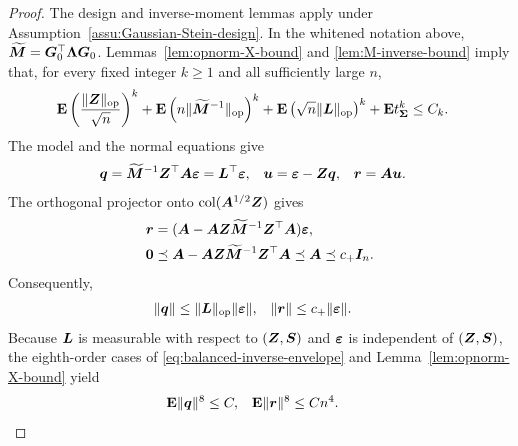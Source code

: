 \documentclass{article}
\theoremstyle{plain} %
\theoremstyle{definition} %
\theoremstyle{definition} %
\begin{document}
\begin{proof}
The design and inverse-moment lemmas apply under
Assumption~\ref{assu:Gaussian-Stein-design}.  In the whitened notation above,
$\widetilde{\boldsymbol{M}}=\boldsymbol{G}_0^\top\boldsymbol{\Lambda}\boldsymbol{G}_0$.
Lemmas~\ref{lem:opnorm-X-bound} and \ref{lem:M-inverse-bound} imply that,
for every fixed integer $k\geq1$ and all sufficiently large $n$,
\begin{align}
    {\mathbf{E}}\left(\frac{\lVert\boldsymbol{Z}\rVert_{\rm op}}{\sqrt n}\right)^k
    +{\mathbf{E}}\left(n\lVert\widetilde{\boldsymbol{M}}^{-1}\rVert_{\rm op}\right)^k
    +{\mathbf{E}}\left(\sqrt n\lVert\boldsymbol{L}\rVert_{\rm op}\right)^k
    +{\mathbf{E}} t_{\boldsymbol{\Sigma}}^k
    &\leq C_k.
    \label{eq:balanced-inverse-envelope}
\end{align}
The model and the normal equations give
\begin{align}
    \boldsymbol{q}&=\widetilde{\boldsymbol{M}}^{-1}\boldsymbol{Z}^\top\boldsymbol{A}{\boldsymbol{\varepsilon} }
        =\boldsymbol{L}^\top{\boldsymbol{\varepsilon} },
    & \boldsymbol{u}&={\boldsymbol{\varepsilon} }-\boldsymbol{Z}\boldsymbol{q},
    & \boldsymbol{r}&=\boldsymbol{A}\boldsymbol{u}.
    \label{eq:balanced-qur}
\end{align}
The orthogonal projector onto $\operatorname{col}(\boldsymbol{A}^{1/2}\boldsymbol{Z})$ gives
\begin{align}
    \boldsymbol{r}&=(\boldsymbol{A}-\boldsymbol{A}\boldsymbol{Z}\widetilde{\boldsymbol{M}}^{-1}\boldsymbol{Z}^\top\boldsymbol{A}){\boldsymbol{\varepsilon} },
    \notag\\
    \mathbf{0}&\preceq\boldsymbol{A}-\boldsymbol{A}\boldsymbol{Z}\widetilde{\boldsymbol{M}}^{-1}\boldsymbol{Z}^\top\boldsymbol{A}
       \preceq\boldsymbol{A}\preceq c_+\boldsymbol{I}_n.
    \label{eq:balanced-residual-contraction}
\end{align}
Consequently,
\begin{align*}
    \lVert\boldsymbol{q}\rVert&\leq\lVert\boldsymbol{L}\rVert_{\rm op}\lVert{\boldsymbol{\varepsilon} }\rVert,
    & \lVert\boldsymbol{r}\rVert&\leq c_+\lVert{\boldsymbol{\varepsilon} }\rVert.
\end{align*}
Because $\boldsymbol{L}$ is measurable with respect to $(\boldsymbol{Z},\boldsymbol{S})$ and ${\boldsymbol{\varepsilon} }$ is
independent of $(\boldsymbol{Z},\boldsymbol{S})$, the eighth-order cases of
\eqref{eq:balanced-inverse-envelope} and
Lemma~\ref{lem:opnorm-X-bound} yield
\begin{align}
    {\mathbf{E}}\lVert\boldsymbol{q}\rVert^{8}&\leq C,
    & {\mathbf{E}}\lVert\boldsymbol{r}\rVert^{8}&\leq Cn^4.
    \label{eq:balanced-response-sufficient-conditions}
\end{align}


\end{proof}
\end{document}
